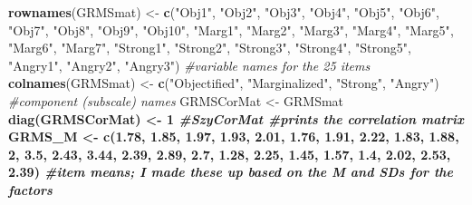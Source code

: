 \documentclass[
  english,
]{book}
\newenvironment{Shaded}{\begin{snugshade}}{\end{snugshade}}
\newcommand{\CommentTok}[1]{\textcolor[rgb]{0.56,0.35,0.01}{\textit{#1}}}
\newcommand{\DecValTok}[1]{\textcolor[rgb]{0.00,0.00,0.81}{#1}}
\newcommand{\FloatTok}[1]{\textcolor[rgb]{0.00,0.00,0.81}{#1}}
\newcommand{\KeywordTok}[1]{\textcolor[rgb]{0.13,0.29,0.53}{\textbf{#1}}}
\newcommand{\NormalTok}[1]{#1}
\newcommand{\OperatorTok}[1]{\textcolor[rgb]{0.81,0.36,0.00}{\textbf{#1}}}
\newcommand{\StringTok}[1]{\textcolor[rgb]{0.31,0.60,0.02}{#1}}
\begin{document}
\begin{Shaded}
\begin{Highlighting}[]
\KeywordTok{rownames}\NormalTok{(GRMSmat) <-}\StringTok{ }\KeywordTok{c}\NormalTok{(}\StringTok{"Obj1"}\NormalTok{, }\StringTok{"Obj2"}\NormalTok{, }\StringTok{"Obj3"}\NormalTok{, }\StringTok{"Obj4"}\NormalTok{, }\StringTok{"Obj5"}\NormalTok{, }\StringTok{"Obj6"}\NormalTok{, }\StringTok{"Obj7"}\NormalTok{, }\StringTok{"Obj8"}\NormalTok{, }\StringTok{"Obj9"}\NormalTok{, }\StringTok{"Obj10"}\NormalTok{, }\StringTok{"Marg1"}\NormalTok{, }\StringTok{"Marg2"}\NormalTok{, }\StringTok{"Marg3"}\NormalTok{, }\StringTok{"Marg4"}\NormalTok{, }\StringTok{"Marg5"}\NormalTok{, }\StringTok{"Marg6"}\NormalTok{, }\StringTok{"Marg7"}\NormalTok{, }\StringTok{"Strong1"}\NormalTok{, }\StringTok{"Strong2"}\NormalTok{, }\StringTok{"Strong3"}\NormalTok{, }\StringTok{"Strong4"}\NormalTok{, }\StringTok{"Strong5"}\NormalTok{, }\StringTok{"Angry1"}\NormalTok{, }\StringTok{"Angry2"}\NormalTok{, }\StringTok{"Angry3"}\NormalTok{) }\CommentTok{#variable names for the 25 items}
\KeywordTok{colnames}\NormalTok{(GRMSmat) <-}\StringTok{ }\KeywordTok{c}\NormalTok{(}\StringTok{"Objectified"}\NormalTok{, }\StringTok{"Marginalized"}\NormalTok{, }\StringTok{"Strong"}\NormalTok{, }\StringTok{"Angry"}\NormalTok{) }\CommentTok{#component (subscale) names}
\NormalTok{GRMSCorMat <-}\StringTok{ }\NormalTok{GRMSmat }\OperatorTok{%
\KeywordTok{diag}\NormalTok{(GRMSCorMat) <-}\StringTok{ }\DecValTok{1}
\CommentTok{#SzyCorMat #prints the correlation matrix}
\NormalTok{GRMS_M <-}\StringTok{ }\KeywordTok{c}\NormalTok{(}\FloatTok{1.78}\NormalTok{,   }\FloatTok{1.85}\NormalTok{,   }\FloatTok{1.97}\NormalTok{,   }\FloatTok{1.93}\NormalTok{,   }\FloatTok{2.01}\NormalTok{,   }\FloatTok{1.76}\NormalTok{,   }\FloatTok{1.91}\NormalTok{,   }\FloatTok{2.22}\NormalTok{,   }\FloatTok{1.83}\NormalTok{,   }\FloatTok{1.88}\NormalTok{, }\DecValTok{2}\NormalTok{,    }\FloatTok{3.5}\NormalTok{,    }\FloatTok{2.43}\NormalTok{,   }\FloatTok{3.44}\NormalTok{,   }\FloatTok{2.39}\NormalTok{,   }\FloatTok{2.89}\NormalTok{,   }\FloatTok{2.7}\NormalTok{, }\FloatTok{1.28}\NormalTok{,  }\FloatTok{2.25}\NormalTok{,   }\FloatTok{1.45}\NormalTok{,   }\FloatTok{1.57}\NormalTok{,   }\FloatTok{1.4}\NormalTok{, }\FloatTok{2.02}\NormalTok{,  }\FloatTok{2.53}\NormalTok{,   }\FloatTok{2.39}\NormalTok{) }\CommentTok{#item means; I made these up based on the M and SDs for the factors}
}
\end{Highlighting}
\end{Shaded}
\end{document}
